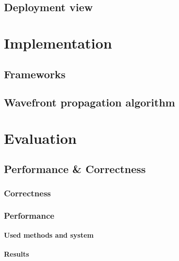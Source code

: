 \documentclass[
	11pt,
	a4paper,
	usegeometry,
	twoside,
	openright,
	toc=chapterentrywithdots
]{scrbook}
\begin{document}
		\section{Deployment view}
		
	
	\chapter{Implementation}
	
		\section{Frameworks}
		
	
		\section{Wavefront propagation algorithm}
		
	
	\chapter{Evaluation}
	
		\section{Performance \& Correctness}
		
			\subsection{Correctness}
			
			\subsection{Performance}
			
			\subsubsection{Used methods and system}
			
			
			\subsubsection{Results}
		
\end{document}
